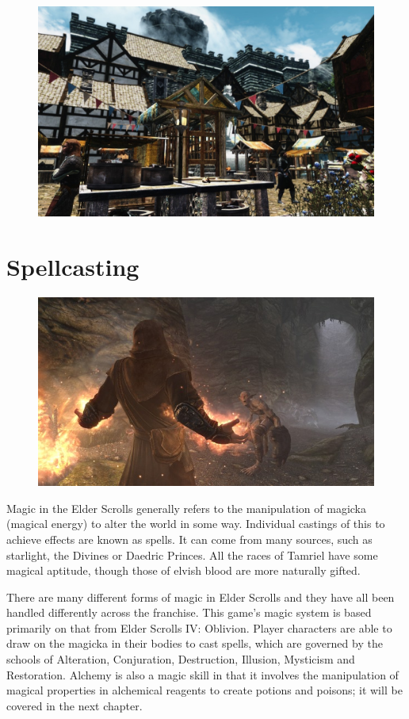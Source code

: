 \documentclass[12pt]{book}
\begin{document}
\begin{figure}[H]
	\includegraphics[width=\textwidth]{market.png}
\end{figure}

\chapter{Spellcasting}

\begin{figure}
	\includegraphics[width=\textwidth]{flamespell.png}
\end{figure}

Magic in the Elder Scrolls generally refers to the manipulation of magicka (magical energy) to alter the world in some way. Individual castings of this to achieve effects are known as spells. It can come from many sources, such as starlight, the Divines or Daedric Princes. All the races of Tamriel have some magical aptitude, though those of elvish blood are more naturally gifted.

There are many different forms of magic in Elder Scrolls and they have all been handled differently across the franchise. This game's magic system is based primarily on that from Elder Scrolls IV: Oblivion. Player characters are able to draw on the magicka in their bodies to cast spells, which are governed by the schools of Alteration, Conjuration, Destruction, Illusion, Mysticism and Restoration. Alchemy is also a magic skill in that it involves the manipulation of magical properties in alchemical reagents to create potions and poisons; it will be covered in the next chapter.
\end{document}
